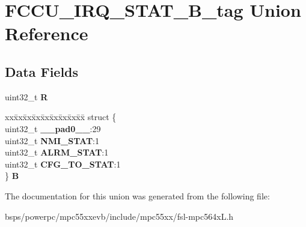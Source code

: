 \hypertarget{unionFCCU__IRQ__STAT__32B__tag}{}\section{F\+C\+C\+U\+\_\+\+I\+R\+Q\+\_\+\+S\+T\+A\+T\+\_\+B\+\_\+tag Union Reference}
\label{unionFCCU__IRQ__STAT__32B__tag}
\subsection*{Data Fields}
\begin{DoxyCompactItemize}
\item 
\mbox{\label{unionFCCU__IRQ__STAT__32B__tag_abb928a37c91d69291f65037a03020b71}} 
uint32\+\_\+t {\bfseries R}
\item 
\mbox{\label{unionFCCU__IRQ__STAT__32B__tag_a7d2c3cb0b6b90cba09196a42aa8f863a}} 
\begin{tabbing}
xx\=xx\=xx\=xx\=xx\=xx\=xx\=xx\=xx\=\kill
struct \{\\
\>uint32\_t {\bfseries \_\_pad0\_\_}:29\\
\>uint32\_t {\bfseries NMI\_STAT}:1\\
\>uint32\_t {\bfseries ALRM\_STAT}:1\\
\>uint32\_t {\bfseries CFG\_TO\_STAT}:1\\
\} {\bfseries B}\\

\end{tabbing}\end{DoxyCompactItemize}


The documentation for this union was generated from the following file\+:\begin{DoxyCompactItemize}
\item 
bsps/powerpc/mpc55xxevb/include/mpc55xx/fsl-\/mpc564x\+L.\+h\end{DoxyCompactItemize}
